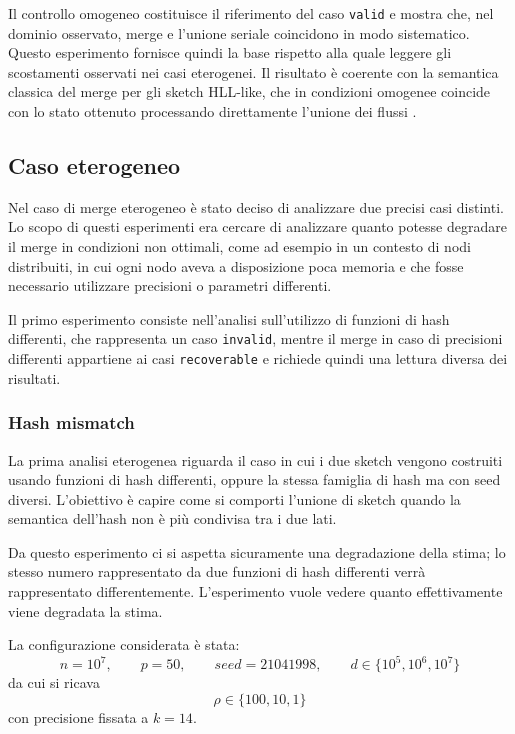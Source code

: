 Il controllo omogeneo costituisce il riferimento del caso \texttt{valid} e
mostra che, nel dominio osservato, merge e l'unione seriale coincidono in
modo sistematico. Questo esperimento fornisce quindi la base rispetto alla quale
leggere gli scostamenti osservati nei casi eterogenei. Il risultato è coerente
con la semantica classica del merge per gli sketch HLL-like, che in condizioni
omogenee coincide con lo stato ottenuto processando direttamente l'unione dei
flussi \cite{Ertl_2017_HLLAlgorithms}.

\subsection{Caso eterogeneo}

Nel caso di merge eterogeneo \`e stato deciso
di analizzare due precisi casi distinti. 
Lo scopo di questi esperimenti era cercare di analizzare quanto potesse degradare
il merge in condizioni non ottimali, come ad esempio in un contesto di nodi distribuiti,
in cui ogni nodo aveva a disposizione poca memoria e che fosse necessario utilizzare
precisioni o parametri differenti.

Il primo esperimento consiste nell'analisi sull'utilizzo di funzioni di hash differenti,
che rappresenta un caso \texttt{invalid}, mentre il
merge in caso di precisioni differenti appartiene ai casi \texttt{recoverable} e
richiede quindi una lettura diversa dei risultati.

\subsubsection{Hash mismatch}

  La prima analisi eterogenea riguarda il caso in cui i due sketch vengono
  costruiti usando funzioni di hash differenti, oppure la stessa famiglia di hash
  ma con seed diversi. L'obiettivo è capire come si comporti l'unione di sketch
  quando la semantica dell'hash non è più condivisa tra i due lati.

  Da questo esperimento ci si aspetta sicuramente una degradazione della stima; 
  lo stesso numero rappresentato da due funzioni di hash differenti verr\`a rappresentato
  differentemente. L'esperimento vuole vedere quanto effettivamente viene degradata la stima.

  La configurazione considerata è stata:
  \[
  n=10^7,\qquad p=50,\qquad seed=21041998,\qquad
  d\in\{10^5,10^6,10^7\}
  \]
  da cui si ricava
  \[
  \rho\in\{100,10,1\}
  \]
  con precisione fissata a \(k=14\).

